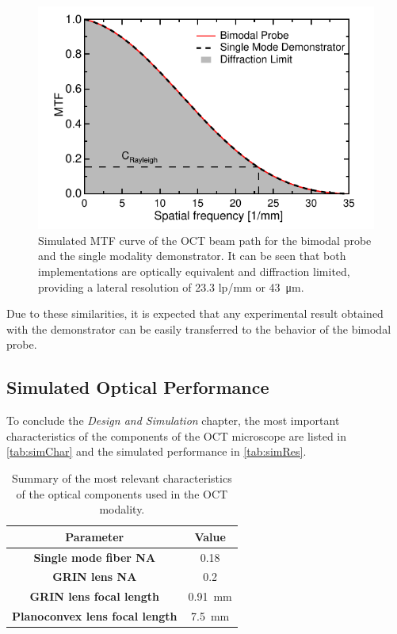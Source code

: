 \begin{figure}[h!]\centering
      \includegraphics{figures/30_DesignSimulation/Optical/MTF/MTFComparison.pdf}
      \caption{Simulated MTF curve of the OCT beam path for the bimodal probe and the single modality demonstrator. It can be seen that both implementations are optically equivalent and diffraction limited, providing a lateral resolution of 23.3 lp/mm or \SI{43}{\micro\meter}.}
      \label{fig:MTFcomp}
\end{figure}

Due to these similarities, it is expected that any experimental result obtained with the demonstrator can be easily transferred to the behavior of the bimodal probe.

\subsection{Simulated Optical Performance}

To conclude the \textit{Design and Simulation} chapter, the most important characteristics of the components of the OCT microscope are listed in \autoref{tab:simChar} and the simulated performance in \autoref{tab:simRes}.

\begin{table}[h!]\centering
	\begin{tabular}{cc}\\
		\textbf{Parameter} & \textbf{Value} \\ 		
		\hline
     	\textbf{Single mode fiber NA} & 0.18 \\ 
		\textbf{GRIN lens NA} & 0.2 \\ 
		\textbf{GRIN lens focal length} & \SI{0.91}{\milli\meter} \\ 
		\textbf{Planoconvex lens focal length} & \SI{7.5}{\milli\meter} \\ 
		\hline
	\end{tabular}
		\caption{Summary of the most relevant characteristics of the optical components used in the OCT modality.}
\label{tab:simChar}
\end{table}

